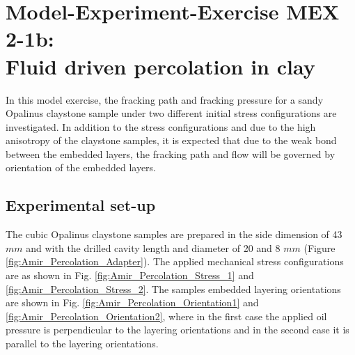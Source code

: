 \section[MEX 2-1b: Fluid driven percolation in clay]{Model-Experiment-Exercise MEX 2-1b:\\Fluid driven percolation in clay}
\label{sec:mex2-1b}
In this model exercise, the fracking path and fracking pressure for a sandy Opalinus claystone sample under two different initial stress configurations are investigated. In addition to the stress configurations and due to the high anisotropy of the claystone samples, it is expected that due to the weak bond between the embedded layers, the fracking path and flow will be governed by orientation of the embedded layers. 
\subsection{Experimental set-up}
The cubic Opalinus claystone samples are prepared in the side dimension of 43 $mm$ and with the drilled cavity length and diameter of 20 and 8 $mm$ (Figure \ref{fig:Amir_Percolation_Adapter}). The applied mechanical stress configurations are as shown in Fig. \ref{fig:Amir_Percolation_Stress_1} and \ref{fig:Amir_Percolation_Stress_2}. The samples embedded layering orientations are shown in Fig. \ref{fig:Amir_Percolation_Orientation1} and \ref{fig:Amir_Percolation_Orientation2}, where in the first case the applied oil pressure is perpendicular to the layering orientations and in the second case it is parallel to the layering orientations.

